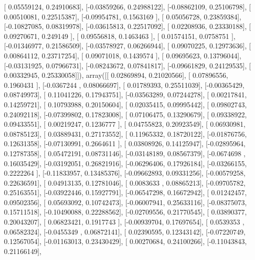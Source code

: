 \documentclass{article}
\begin{document}
       [ 0.05559124,  0.24910683],
       [-0.03859266,  0.24988122],
       [-0.08862109,  0.25106798],
       [ 0.00510081,  0.22515387],
       [-0.09954781,  0.1563169 ],
       [ 0.05056728,  0.23859384],
       [-0.10827085,  0.08319978],
       [-0.03615813,  0.22517092],
       [ 0.02208936,  0.23330188],
       [ 0.09270671,  0.249149  ],
       [ 0.09556818,  0.1463463 ],
       [ 0.01574151,  0.0758751 ],
       [-0.01346977,  0.21586509],
       [-0.03578927,  0.06266944],
       [ 0.09070225,  0.12973636],
       [ 0.00864112,  0.23717254],
       [ 0.09071018,  0.1439574 ],
       [ 0.09695623,  0.13796044],
       [-0.03131925,  0.07966731],
       [-0.08243672,  0.07841817],
       [-0.09661829,  0.24129535],
       [ 0.00332945,  0.25330058]]), array([[ 0.02869894,  0.21020566],
       [ 0.07896556,  0.1960431 ],
       [-0.0367244 ,  0.08066697],
       [ 0.01789393,  0.25511039],
       [-0.00365429,  0.08749973],
       [ 0.11041226,  0.17943751],
       [-0.03563289,  0.07244278],
       [ 0.00217841,  0.14259721],
       [ 0.10793988,  0.20150604],
       [ 0.02035415,  0.09995442],
       [ 0.09802743,  0.24092118],
       [-0.07399802,  0.17823008],
       [ 0.07106475,  0.13290679],
       [ 0.09338922,  0.09433551],
       [ 0.00219247,  0.1236777 ],
       [ 0.04755823,  0.20923549],
       [ 0.06930981,  0.08785123],
       [ 0.03889431,  0.27173552],
       [ 0.11965332,  0.18720122],
       [-0.01876756,  0.12631358],
       [-0.07130991,  0.2664611 ],
       [ 0.03808926,  0.14125947],
       [-0.02895964,  0.12787358],
       [ 0.05472191,  0.08731146],
       [-0.03148189,  0.08567379],
       [-0.0674698 ,  0.16035429],
       [-0.03192051,  0.26821916],
       [-0.06296406,  0.17926184],
       [-0.03266155,  0.2222264 ],
       [-0.11833957,  0.13485376],
       [-0.09662893,  0.09331256],
       [-0.00579258,  0.22636591],
       [ 0.04913135,  0.12781046],
       [ 0.0083633 ,  0.08865213],
       [-0.09705782,  0.25163551],
       [-0.03922446,  0.15927791],
       [-0.06547298,  0.16672942],
       [ 0.01242457,  0.09502356],
       [ 0.05693092,  0.10742473],
       [-0.06007941,  0.25633116],
       [-0.08375073,  0.15711518],
       [-0.10490088,  0.22288562],
       [-0.02709556,  0.21770545],
       [ 0.03890377,  0.20043207],
       [ 0.06823421,  0.1917743 ],
       [-0.00939704,  0.17697654],
       [ 0.0539353 ,  0.06582324],
       [-0.0455349 ,  0.06872141],
       [ 0.02390595,  0.12343142],
       [-0.07220749,  0.12567054],
       [-0.01163013,  0.23430429],
       [ 0.00270684,  0.24100266],
       [-0.11043843,  0.21166149],
\end{document}
